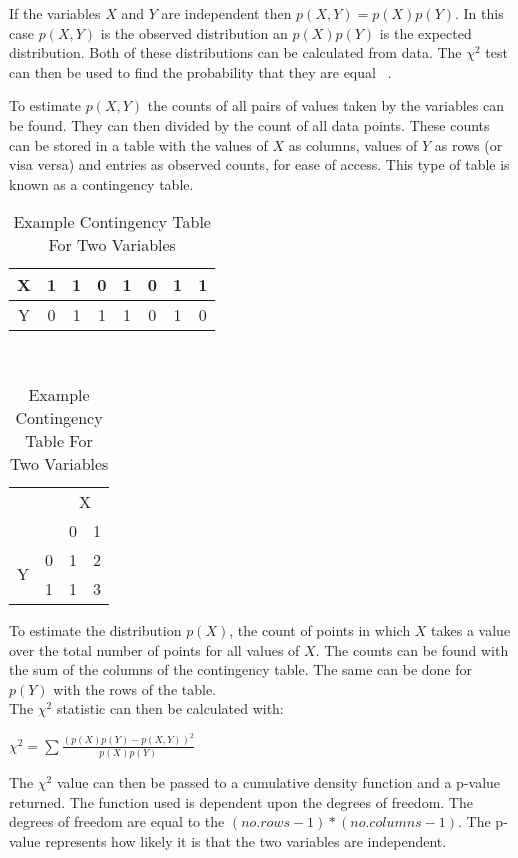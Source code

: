 \documentclass{UoYCSproject}
\begin{document}
If the variables $X$ and $Y$ are independent then $p(X,Y) = p(X)p(Y)$. In this case $p(X,Y)$ is the observed distribution an $p(X)p(Y)$ is the expected distribution. Both of these distributions can be calculated from data. The $\chi^2$ test can then be used to find the probability that they are equal ~\parencite{Pearson}.

To estimate $p(X,Y)$ the counts of all pairs of values taken by the variables can be found. They can then divided by the count of all data points. These counts can be stored in a table with the values of $X$ as columns, values of $Y$ as rows (or visa versa) and entries as observed counts, for ease of access. This type of table is known as a contingency table.

\begin{table}[h!]
	\centering
	\begin{tabular}{c|c c c c c c c}
		X & 1 & 1 & 0 & 1 & 0 & 1 & 1\\ \hline
		Y & 0 & 1 & 1 & 1 & 0 & 1 & 0\\
	\end{tabular}
\\
	\begin{tabular}{c|c|cc|}
		\multicolumn{2}{c}{}& \multicolumn{2}{c}{X} \\ \cline{3-4}
		\multicolumn{2}{c|}{} & 0 & 1 \\ \cline{2-4}
		\multirow{2}{*}{Y} & 0 & 1 & 2\\
		& 1 & 1 & 3 \\
		\cline{2-4} 
	\end{tabular}
\caption{Example Contingency Table For Two Variables}
\end{table}

To estimate the distribution $p(X)$, the count of points in which $X$ takes a value over the total number of points for all values of $X$. The counts can be found with the sum of the columns of the contingency table. The same can be done for $p(Y)$ with the rows of the table.\\

The $\chi^2$ statistic can then be calculated with:

\begin{center}
	$\chi^2 = \sum\frac{(p(X)p(Y)-p(X,Y))^2}{p(X)p(Y)}$
\end{center}

The $\chi^2$ value can then be passed to a cumulative density function and a p-value returned. The function used is dependent upon the degrees of freedom. The degrees of freedom are equal to the $(no. rows -1)*(no. columns -1)$. The p-value represents how likely it is that the two variables are independent.\\
\end{document}
